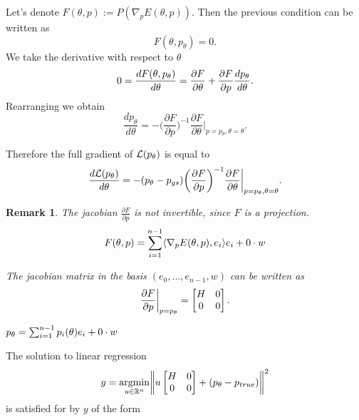 \documentclass[a4paper,10pt]{report}
\newtheorem{remark}{Remark}
\begin{document}
Let's denote $F(\theta,p) :=P (\nabla_p E(\theta,p)).$ Then the previous condition can be written as
\begin{equation}
 F(\theta,p_\theta) = 0.
\end{equation}
We take the derivative with respect to $\theta$
\begin{equation}
0=\frac{dF(\theta, p_\theta)}{d \theta} = \frac{\partial F}{\partial \theta} + \frac{\partial F}{\partial p} \frac{dp_\theta}{d \theta}.
\end{equation}
Rearranging we obtain
\begin{equation}
 \frac{d p_\theta}{d\theta} = - \bigg(\frac{\partial F}{\partial p}\bigg)^{-1}  \frac{\partial F}{\partial \theta}\bigg|_{p=p_\theta, \theta=\theta}.
\end{equation}

Therefore the full gradient of $\mathcal{L}(p_\theta)$ is equal to
\begin{equation}
 \frac{d\mathcal{L}(p_\theta)}{d \theta} = - (p_\theta - p_{gs})\bigg(\frac{\partial F}{\partial p}\bigg)^{-1}  \frac{\partial F}{\partial \theta}\bigg|_{p=p_\theta, \theta=\theta}.
\end{equation}
\begin{remark}
 The jacobian $\frac{\partial F}{\partial p}$ is not invertible, since $F$ is a projection.
 \begin{equation}
  F(\theta, p) = \sum_{i=1}^{n-1} \langle \nabla_p E(\theta, p), e_i \rangle e_i +  0 \cdot w
 \end{equation}

 The jacobian matrix in the basis $(e_0,...,e_{n-1},w)$ can be written as \begin{equation}
                      \frac{\partial F}{\partial p}\bigg|_{p=p_\theta} =\begin{bmatrix}
H & 0 \\
0 & 0
\end{bmatrix}.
                     \end{equation}



 $p_\theta = \sum_{i=1}^{n-1}p_i(\theta) e_i +  0 \cdot w$
\end{remark}

The solution to linear regression
\begin{equation}
 y = \underset{u\in \mathbb{R}^n}{\mathrm{argmin }}\bigg\|u \begin{bmatrix}
H & 0 \\
0 & 0
\end{bmatrix} + (p_\theta-p_{true})\bigg\|^2
\end{equation}
is satisfied for by $y$ of the form
\end{document}
